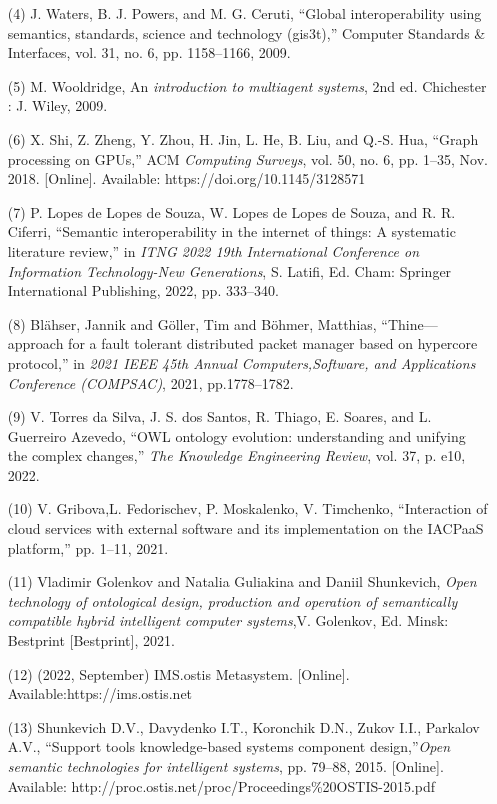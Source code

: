 \documentclass[10pt, a4paper]{article}
\begin{document}
\begin{multicols}
\begin{enumerate}
 \item[(4)] J. Waters, B. J. Powers, and M. G. Ceruti, “Global interoperability using semantics, standards, science and technology (gis3t),” Computer Standards \& Interfaces, vol. 31, no. 6, pp. 1158–1166, 2009.
\item[(5)] M. Wooldridge, An \textit{introduction to multiagent systems}, 2nd ed. Chichester : J. Wiley, 2009.
\item[(6)] X. Shi, Z. Zheng, Y. Zhou, H. Jin, L. He, B. Liu, and Q.-S. Hua, “Graph processing on GPUs,” ACM \textit{Computing Surveys}, vol. 50, no. 6, pp. 1–35, Nov. 2018. [Online]. Available: https://doi.org/10.1145/3128571
\item[(7)] P. Lopes de Lopes de Souza, W. Lopes de Lopes de Souza, and R. R. Ciferri, “Semantic interoperability in the internet of things: A systematic literature review,” in \textit{ITNG 2022 19th International Conference on Information Technology-New Generations}, S. Latifi, Ed. Cham: Springer International Publishing, 2022, pp. 333–340.
\item[(8)]  Blähser, Jannik and Göller, Tim and Böhmer, Matthias, “Thine— approach for a fault tolerant distributed packet manager based on hypercore protocol,” in \textit{2021 IEEE 45th Annual Computers,Software, and Applications Conference (COMPSAC)}, 2021, pp.1778–1782.
\item[(9)] V. Torres da Silva, J. S. dos Santos, R. Thiago, E. Soares, and L. Guerreiro Azevedo, “OWL ontology evolution: understanding and unifying the complex changes,” \textit{The Knowledge Engineering Review}, vol. 37, p. e10, 2022.
\item[(10)] V. Gribova,L. Fedorischev, P. Moskalenko, V. Timchenko, “Interaction of cloud services with external software and its implementation on the IACPaaS platform,” pp. 1–11, 2021.
\item[(11)] Vladimir Golenkov and Natalia Guliakina and Daniil Shunkevich, \textit{Open technology of ontological design, production and operation of semantically compatible hybrid intelligent computer systems},V. Golenkov, Ed. Minsk: Bestprint [Bestprint], 2021.
\item[(12)] (2022, September) IMS.ostis Metasystem. [Online]. Available:https://ims.ostis.net
\item[(13)] Shunkevich D.V., Davydenko I.T., Koronchik D.N., Zukov I.I., Parkalov A.V., “Support tools knowledge-based systems component design,”\textit{Open semantic technologies for intelligent systems}, pp. 79–88, 2015. [Online]. Available: http://proc.ostis.net/proc/Proceedings\%20OSTIS-2015.pdf

\end{enumerate}
\end{multicols}
\end{document}
